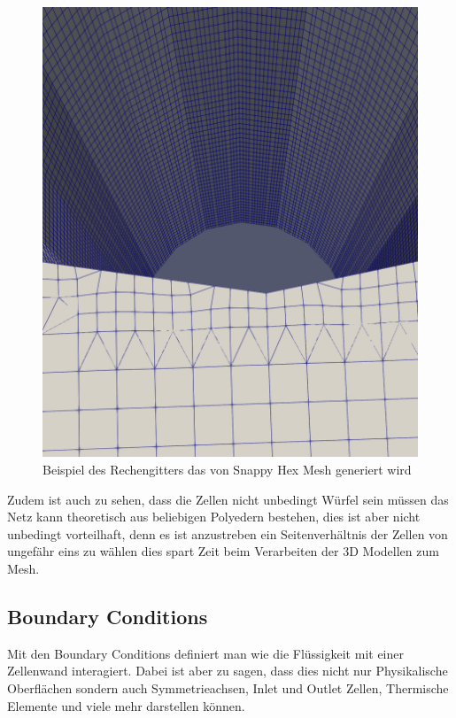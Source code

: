 \begin{figure}[h]
	\centering
	\includegraphics[scale=0.1]{papers/openfoam/Bilder/grid.png }
	\caption{Beispiel des Rechengitters das von Snappy Hex Mesh generiert wird}
	\label{openfoam:fig:sim_grid}
\end{figure}
Zudem ist auch zu sehen, dass die Zellen nicht unbedingt Würfel sein müssen das Netz kann theoretisch aus beliebigen Polyedern bestehen, dies ist aber nicht unbedingt vorteilhaft, denn es ist anzustreben ein Seitenverhältnis der Zellen von ungefähr eins zu wählen dies spart Zeit beim Verarbeiten der 3D Modellen zum Mesh.

\subsection{Boundary Conditions}
Mit den Boundary Conditions definiert man wie die Flüssigkeit mit einer Zellenwand interagiert.
Dabei ist aber zu sagen, dass dies nicht nur Physikalische Oberflächen sondern auch Symmetrieachsen, Inlet und Outlet Zellen, Thermische Elemente und viele mehr darstellen können.

